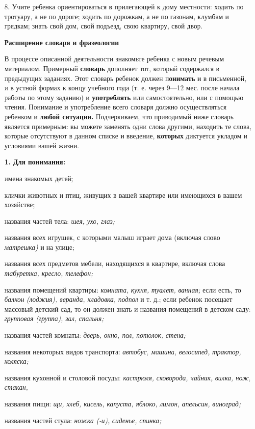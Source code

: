 \documentclass[a5paper]{book}
\renewcommand{\emph}[1]{\textit{#1}}
\begin{document}
8. Учите ребенка ориентироваться в прилегающей к дому местности: ходить
по тротуару, а не по дороге; ходить по дорожкам, а не по газонам,
клумбам и грядкам; знать свой дом, свой подъезд, свою квартиру, свой
двор.

\textbf{Расширение словаря и фразеологии}

В процессе описанной деятельности знакомьте ребенка с новым речевым
материалом. Примерный \textbf{словарь} дополняет тот, который содержался
в предыдущих заданиях. Этот словарь ребенок должен п\textbf{онимать} и в
письменной, и в устной формах к концу учебного года (т. е. через 9---12
мес. после начала работы по этому заданию) и \textbf{употреблять} или
самостоятельно, или с помощью чтения. Понимание и употребление всего
словаря должно осуществляться ребенком и \textbf{любой ситуации.}
Подчеркиваем, что приводимый ниже словарь является примерным: вы можете
заменять одни слова другими, находить те слова, которые отсутствуют в
данном списке и введение, \textbf{которых} диктуется укладом и условиями
вашей жизни.

\textbf{1. Для понимания:}

имена знакомых детей;

клички животных и птиц, живущих в вашей квартире или имеющихся в вашем
хозяйстве;

названия частей тела: \emph{шея, ухо, глаз;}

названия всех игрушек, с которыми малыш играет дома (включая слово
\emph{матрешка)} и на улице;

названия всех предметов мебели, находящихся в квартире, включая слова
\emph{табуретка, кресло, телефон;}

названия помещений квартиры: \emph{комната, кухня, туалет, ванная;} если
есть, то \emph{балкон (лоджия), веранда, кладовка, подпол} и т. д.; если
ребенок посещает массовый детский сад, то он должен знать и названия
помещений в детском саду: \emph{групповая (группа), зал, спальня;}

названия частей комнаты: \emph{дверь, окно, пол, потолок, стена;}

названия некоторых видов транспорта: \emph{автобус, машина, велосипед,
трактор, коляска;}

названия кухонной и столовой посуды: \emph{кастрюля, сковорода, чайник,
вилка, нож, стакан,}

названия пищи: \emph{щи, хлеб, кисель, капуста, яблоко, лимон, апельсин,
виноград;}

названия частей стула: \emph{ножка (-и), сиденье, спинка;}
\end{document}
